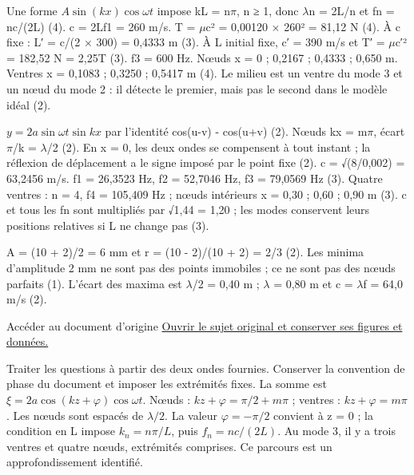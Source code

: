 Une forme $A\sin(kx)\cos\omega t$ impose kL = n\ensuremath{\pi}, n ≥ 1, donc \ensuremath{\lambda}n = 2L/n et fn = nc/(2L) (4). c = 2Lf1 = 260 m/s. T = \ensuremath{\mu}c² = 0,00120 × 260² = 81,12 N (4).
À c fixe : L′ = c/(2 × 300) = 0,4333 m (3). À L initial fixe, c′ = 390 m/s et T′ = \ensuremath{\mu}c′² = 182,52 N = 2,25T (3).
f3 = 600 Hz. Nœuds x = 0 ; 0,2167 ; 0,4333 ; 0,650 m. Ventres x = 0,1083 ; 0,3250 ; 0,5417 m (4). Le milieu est un ventre du mode 3 et un nœud du mode 2 : il détecte le premier, mais pas le second dans le modèle idéal (2).


$y=2a\sin\omega t\sin kx$ par l’identité cos(u-v) - cos(u+v) (2). Nœuds kx = m\ensuremath{\pi}, écart \ensuremath{\pi}/k = \ensuremath{\lambda}/2 (2). En x = 0, les deux ondes se compensent à tout instant ; la réflexion de déplacement a le signe imposé par le point fixe (2).
c = √(8/0,002) = 63,2456 m/s. f1 = 26,3523 Hz, f2 = 52,7046 Hz, f3 = 79,0569 Hz (3). Quatre ventres : n = 4, f4 = 105,409 Hz ; nœuds intérieurs x = 0,30 ; 0,60 ; 0,90 m (3). c et tous les fn sont multipliés par √1,44 = 1,20 ; les modes conservent leurs positions relatives si L ne change pas (3).


A = (10 + 2)/2 = 6 mm et r = (10 - 2)/(10 + 2) = 2/3 (2). Les minima d’amplitude 2 mm ne sont pas des points immobiles ; ce ne sont pas des nœuds parfaits (1). L’écart des maxima est \ensuremath{\lambda}/2 = 0,40 m ; \ensuremath{\lambda} = 0,80 m et c = \ensuremath{\lambda}f = 64,0 m/s (2).


\begin{loi}{Accéder au document d’origine}
\href{https://etienne-thibierge.fr/cours_mpsi/O4_ondes_td-enonce.pdf}{Ouvrir le sujet original et conserver ses figures et données.}
\end{loi}
Traiter les questions à partir des deux ondes fournies. Conserver la convention de phase du document et imposer les extrémités fixes.
La somme est $\xi=2a\cos(kz+\varphi)\cos\omega t$. Nœuds : $kz+\varphi=\pi/2+m\pi$ ; ventres : $kz+\varphi=m\pi$. Les nœuds sont espacés de $\lambda/2$. La valeur $\varphi=-\pi/2$ convient à z = 0 ; la condition en L impose $k_n=n\pi/L$, puis $f_n=nc/(2L)$. Au mode 3, il y a trois ventres et quatre nœuds, extrémités comprises. Ce parcours est un approfondissement identifié.

